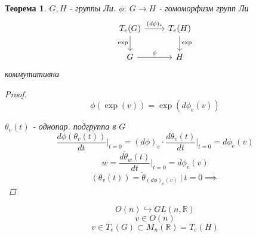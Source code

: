 \documentclass[a4paper]{article}
\newtheorem*{theorem}{Теорема}
\theoremstyle{definition}
\theoremstyle{remark}
\begin{document}
\begin{tcolorbox}
\begin{theorem}
    $ G, H $ - группы Ли. $ \phi: \ G \to H $ - гомоморфизм групп Ли
    \[
        \begin{tikzcd}
            T_e(G) \arrow{r}{(d \phi)_e } \arrow[swap]{d}{\exp} & T_e(H) \arrow{d}{\exp}\\
            G \arrow{r}{\phi} & H
        \end{tikzcd}
    \]
    коммутативна

    \begin{proof}
        \[
            \phi(\exp(v)) = \exp(d \phi_e(v))
        \]

        $ \theta_v(t) $ - однопар. подгруппа в $ G $ 
        \[
            \frac{d \phi(\theta_v(t))}{dt} \bigg|_{t=0} = (d \phi)_e \cdot 
            \frac{d\theta_v(t)}{dt} \bigg|_{t=0} = d \phi_e(v)
        \]
        \[
            w = \frac{d \tilde{\theta}_w(t)}{dt} \bigg|_{t=0} = d \phi_e(v)
        \]
        \[
            (\theta_v(t)) = \widetilde{\theta}_{(d \phi)_e(v)} \ | \ t = 0 \implies
        \]
    \end{proof}
\end{theorem}
\end{tcolorbox}

\[
    O(n) \hookrightarrow GL(n, \mathbb{R})
\]
\[
    v \in O(n)
\]
\[
    v \in T_e(G) \subset M_n(\mathbb{R}) = T_e(H)
\]
\end{document}

